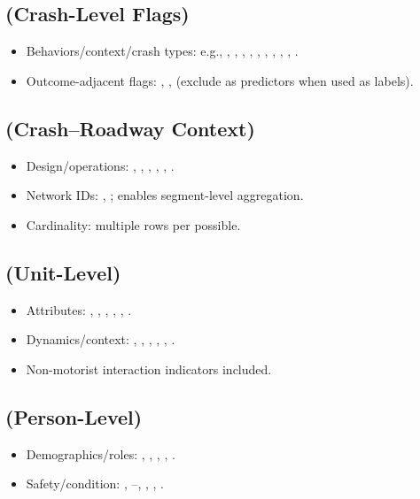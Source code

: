 \documentclass[journal]{IEEEtran}
\begin{document}
\subsection{ (Crash-Level Flags)}
\begin{itemize}
\item Behaviors/context/crash types: e.g., , , , ,
, , , , , .
\item Outcome-adjacent flags: , ,  (exclude as predictors when used as
labels).
\end{itemize}

\subsection{ (Crash--Roadway Context)}
\begin{itemize}
\item Design/operations: , , , , ,
.
\item Network IDs: , ; enables segment-level aggregation.
\item Cardinality: multiple rows per  possible.
\end{itemize}

\subsection{ (Unit-Level)}
\begin{itemize}[nosep]
\item Attributes: , , , , , .
\item Dynamics/context: , , , , ,
.
\item Non-motorist interaction indicators included.
\end{itemize}

\subsection{ (Person-Level)}
\begin{itemize}
\item Demographics/roles: , , , , .
\item Safety/condition: , --, , ,
.
\end{itemize}
\end{document}
